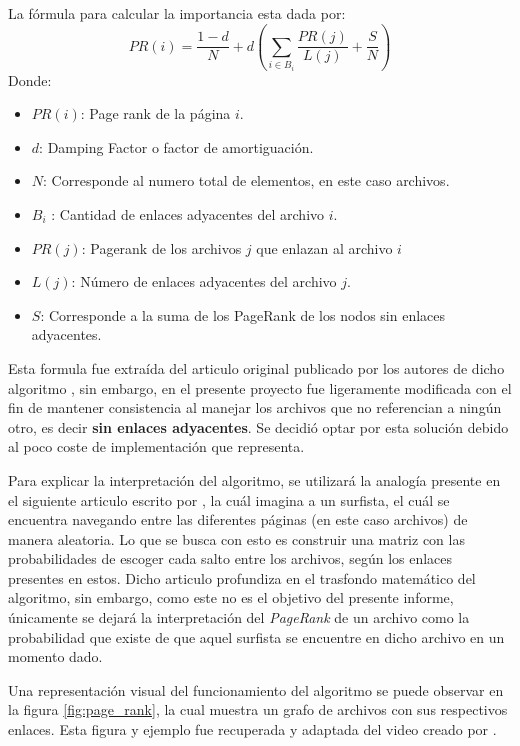 La fórmula para calcular la importancia esta dada por:
\begin{equation}
PR(i) = \frac{1-d}{N} +d\left( \sum\limits_{i \in B_{i}}^{} \frac{PR(j)}{L(j)} +\frac{S}{N} \right)
\label{eq:PageRank}
\end{equation}
Donde:
\begin{itemize}
    \item $PR(i)$: Page rank de la página $i$.
    \item $d$: Damping Factor o factor de amortiguación.
    \item $N$: Corresponde al numero total de elementos, en este caso archivos.
    \item $B_{i}$ : Cantidad de enlaces adyacentes del archivo $i$.
    \item $PR(j)$: Pagerank de los archivos $j$ que enlazan al archivo $i$
    \item $L(j)$: Número de enlaces adyacentes del archivo $j$.
    \item $S$: Corresponde a la suma de los PageRank de los nodos sin enlaces adyacentes.
\end{itemize}

Esta formula fue extraída del articulo original publicado por los autores de dicho algoritmo \cite{PageRankArticle}, sin embargo, en el presente proyecto fue ligeramente modificada con el fin de mantener consistencia al manejar los archivos que no referencian a ningún otro, es decir \textbf{sin enlaces adyacentes}. Se decidió optar por esta solución debido al poco coste de implementación que representa.

Para explicar la interpretación del algoritmo, se utilizará la analogía presente en el siguiente articulo escrito por \textcite{IntroduccionPageRank}, la cuál imagina a un surfista, el cuál se encuentra navegando entre las diferentes páginas (en este caso archivos) de manera aleatoria. Lo que se busca con esto es construir una matriz con las probabilidades de escoger cada salto entre los archivos, según los enlaces presentes en estos. Dicho articulo profundiza en el trasfondo matemático del algoritmo, sin embargo, como este no es el objetivo del presente informe, únicamente se dejará la interpretación del \textit{PageRank} de un archivo como la probabilidad que existe de que aquel surfista se encuentre en dicho archivo en un momento dado.

Una representación visual del funcionamiento del algoritmo se puede observar en la figura \ref{fig:page_rank}, la cual muestra un grafo de archivos con sus respectivos enlaces. Esta figura y ejemplo fue recuperada y adaptada del video creado por \textcite{PageRankVideo}.

